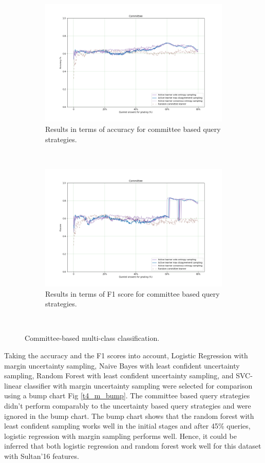\begin{figure}[!htb]
	\begin{subfigure}[b]{0.5\textwidth}
		\includegraphics[width=\textwidth]{images/task4_accuracy_com}
		\caption{Results in terms of accuracy for committee based query strategies.}
		\label{t4_m_com}
	\end{subfigure}
	~
	\begin{subfigure}[b]{0.5\textwidth}
		\includegraphics[width=\textwidth]{images/task4_f1score_com}
		\caption{Results in terms of F1 score for committee based query strategies.}
		\label{t4_m_com_f1}
	\end{subfigure}
	~
	\caption{Committee-based multi-class classification.}
\end{figure}

Taking the accuracy and the F1 scores into account, Logistic Regression with margin uncertainty sampling, Naive Bayes with least confident uncertainty sampling, Random Forest with least confident uncertainty sampling, and SVC-linear classifier with margin uncertainty sampling were selected for comparison using a bump chart Fig \ref{t4_m_bump}. The committee based query strategies didn't perform comparably to the uncertainty based query strategies and were ignored in the bump chart. The bump chart shows that the random forest with least confident sampling works well in the initial stages and after 45\% queries, logistic regression with margin sampling performs well. Hence, it could be inferred that both logistic regression and random forest work well for this dataset with Sultan'16 features.

